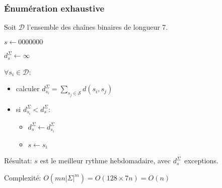 \documentclass[table]{beamer}
\newcommand{\+}{\cellcolor[gray]{1}\bfseries}
\newcommand{\<}{\cellcolor[gray]{0.8}\rmfamily\itshape}
\def\S{\mathcal{S}}
\begin{document}
\begin{frame}
  \frametitle{Énumération exhaustive}

  Soit $\mathcal{D}$ l'ensemble des chaînes binaires de longueur 7.

  $s \leftarrow 0000000$

  $d^\Sigma_s \leftarrow \infty$

  $\forall s_i \in \mathcal{D}$: 
  \begin{itemize}
  \item calculer
    \begin{math}
      \displaystyle
      d^\Sigma_{s_i} = \sum_{s_j\in\S} d(s_i, s_j)
    \end{math} 
  \item si $d^\Sigma_{s_i} < d^\Sigma_s$:
    \begin{itemize}
    \item $d^\Sigma_s \leftarrow d^\Sigma_{s_i}$
    \item $s \leftarrow s_i$
    \end{itemize}
  \end{itemize}

  Résultat: $s$ est le meilleur rythme hebdomadaire, avec
  $d^\Sigma_s$~exceptions.\pause

  \vspace{2ex}

  Complexité: $O(mn|\Sigma|^m) = O(128 \times 7n) = O(n)$
\end{frame}
\end{document}
